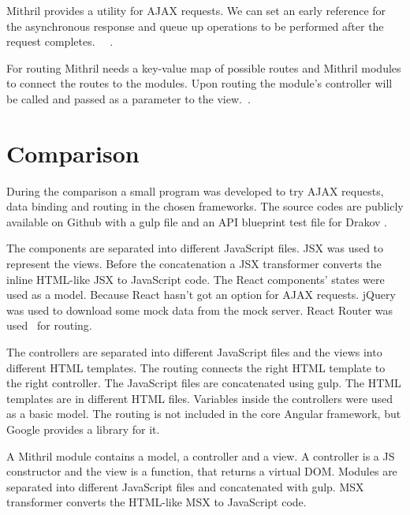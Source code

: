 Mithril provides a utility for AJAX requests. We can set an early reference for the asynchronous response and queue up operations to be performed after the request completes.  ~\cite{Mithril-webservice}~\cite{Mithril-request}.


For routing Mithril needs a key-value map of possible routes and Mithril modules to connect the routes to the modules. Upon routing the module's controller will be called and passed as a parameter to the view.~\cite{Mithril-routing}.

\section{Comparison}

During the comparison a small program was developed to try AJAX requests, data binding and routing in the chosen frameworks. The source codes are publicly available on Github with a gulp file  and an API blueprint test file for Drakov .

The components are separated into different JavaScript files. JSX was used to represent the views. Before the concatenation a JSX transformer converts the inline HTML-like JSX to JavaScript code. The React components' states were used as a model. Because React hasn't got an option for AJAX requests. jQuery was used to download some mock data from the mock server. React Router was used~\cite{React-router} for routing. 


The controllers are separated into different JavaScript files and the views into different HTML templates. The routing connects the right HTML template to the right controller. The JavaScript files are concatenated using gulp. The HTML templates are in different HTML files. Variables inside the controllers were used as a basic model. The routing is not included in the core Angular framework, but Google provides a library for it.


A Mithril module contains a model, a controller and a view. A controller is a JS constructor and the view is a function, that returns a virtual DOM. Modules are separated into different JavaScript files and concatenated with gulp. MSX transformer converts the HTML-like MSX to JavaScript code. 


